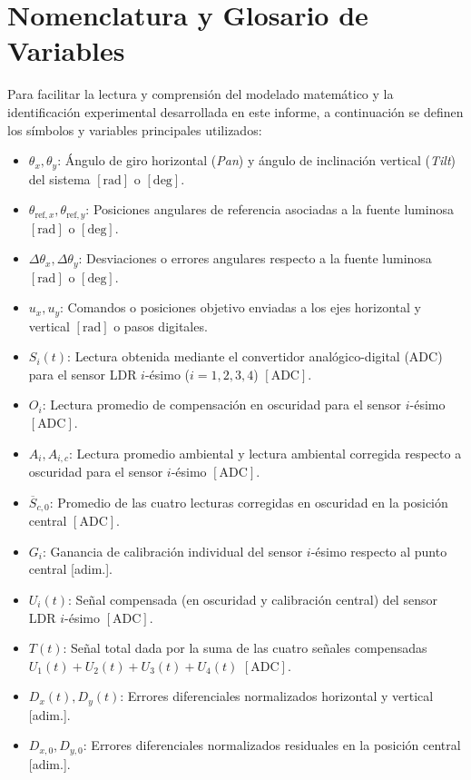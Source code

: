 \documentclass[12pt,a4paper]{article}
\begin{document}
\section{Nomenclatura y Glosario de Variables}
Para facilitar la lectura y comprensión del modelado matemático y la identificación experimental desarrollada en este informe, a continuación se definen los símbolos y variables principales utilizados:

\begin{itemize}
    \item $\theta_x, \theta_y$: Ángulo de giro horizontal (\emph{Pan}) y ángulo de inclinación vertical (\emph{Tilt}) del sistema $[\text{rad}]$ o $[\text{deg}]$.
    \item $\theta_{\mathrm{ref},x}, \theta_{\mathrm{ref},y}$: Posiciones angulares de referencia asociadas a la fuente luminosa $[\text{rad}]$ o $[\text{deg}]$.
    \item $\Delta\theta_x, \Delta\theta_y$: Desviaciones o errores angulares respecto a la fuente luminosa $[\text{rad}]$ o $[\text{deg}]$.
    \item $u_x, u_y$: Comandos o posiciones objetivo enviadas a los ejes horizontal y vertical $[\text{rad}]$ o pasos digitales.
    \item $S_i(t)$: Lectura obtenida mediante el convertidor analógico-digital (ADC) para el sensor LDR $i$-ésimo ($i = 1, 2, 3, 4$) $[\text{ADC}]$.
    \item $O_i$: Lectura promedio de compensación en oscuridad para el sensor $i$-ésimo $[\text{ADC}]$.
    \item $A_i, A_{i,c}$: Lectura promedio ambiental y lectura ambiental corregida respecto a oscuridad para el sensor $i$-ésimo $[\text{ADC}]$.
    \item $\overline{S}_{c,0}$: Promedio de las cuatro lecturas corregidas en oscuridad en la posición central $[\text{ADC}]$.
    \item $G_i$: Ganancia de calibración individual del sensor $i$-ésimo respecto al punto central [adim.].
    \item $U_i(t)$: Señal compensada (en oscuridad y calibración central) del sensor LDR $i$-ésimo $[\text{ADC}]$.
    \item $T(t)$: Señal total dada por la suma de las cuatro señales compensadas $U_1(t)+U_2(t)+U_3(t)+U_4(t)$ $[\text{ADC}]$.
    \item $D_x(t), D_y(t)$: Errores diferenciales normalizados horizontal y vertical [adim.].
    \item $D_{x,0}, D_{y,0}$: Errores diferenciales normalizados residuales en la posición central [adim.].

\end{itemize}
\end{document}
